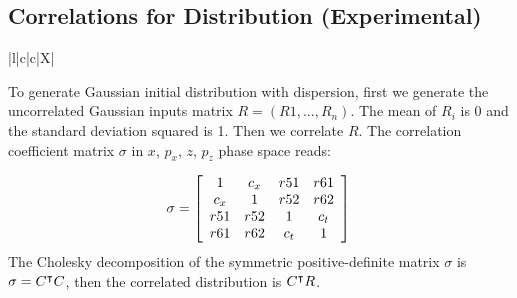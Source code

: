 \subsection{Correlations for  Distribution (Experimental)}

\begin{table}[!htb]
  \begin{center}\footnotesize
    \caption{Definition of additional distribution attributes for a 
      distribution type for generating correlations in the beam.}
    \label{tab:distattrcorrgauss}
    \begin{tabularx}{\textwidth-1cm}{|l|c|c|X|}
      \hline
      \hline
      \hline
    \end{tabularx}
  \end{center}
\end{table}

To generate Gaussian initial distribution with dispersion, first we generate the uncorrelated Gaussian inputs matrix
$R=(R1,...,R_n)$. The mean of $R_i$ is $0$ and the standard deviation squared is 1. Then we correlate $R$.
The correlation coefficient matrix $\sigma$ in $x$, $p_x$, $z$, $p_z$ phase space reads:

\begin{equation*}
\sigma= \left[
\begin{array}{cccc}
1    &c_x&r51    &r61\\
c_x&1    &r52    &r62\\
r51  &r52  &1      &c_t\\
r61  &r62  &c_t  &1\\
\end{array}
\right] \\
\end{equation*}
The Cholesky decomposition of the symmetric positive-definite matrix $\sigma$ is $\sigma=C^\intercal C$, then the correlated
distribution is $C^\intercal R$.

